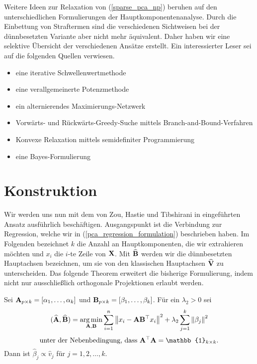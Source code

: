 Weitere Ideen zur Relaxation von (\ref{sparse_pca_np}) beruhen auf den unterschiedlichen Formulierungen der Hauptkomponentenanalyse. Durch die Einbettung von Straftermen sind die verschiedenen Sichtweisen bei der dünnbesetzten Variante aber nicht mehr äquivalent. Daher haben wir eine selektive Übersicht der verschiedenen Ansätze erstellt. Ein interessierter Leser sei auf die folgenden Quellen verwiesen.
\begin{itemize}
\item eine iterative Schwellenwertmethode \cite{shen, witten}
\item eine verallgemeinerte Potenzmethode \cite{journee}
\item ein alternierendes Maximierungs-Netzwerk \cite{richtarik}
\item Vorwärts- und Rückwärts-Greedy-Suche mittels Branch-and-Bound-Verfahren \cite{moghaddam}
\item Konvexe Relaxation mittels semidefiniter Programmierung \cite{daspremont_semidefinite}
\item eine Bayes-Formulierung \cite{guan}
\end{itemize}




\section{Konstruktion}
\label{construction}

Wir werden uns nun mit dem von Zou, Hastie und Tibshirani in \cite{zou_sparsepca} eingeführten Ansatz ausführlich beschäftigen. Ausgangspunkt ist die Verbindung zur Regression, welche wir in (\ref{pca_regression_formulation}) beschrieben haben. Im Folgenden bezeichnet $k$ die Anzahl an Hauptkomponenten, die wir extrahieren möchten und $x_i$ die $i$-te Zeile von $\mathbf{X}$. Mit $\widehat{\mathbf{B}}$ werden wir die dünnbesetzten Hauptachsen bezeichnen, um sie von den klassischen Hauptachsen $\widehat{\mathbf{V}}$ zu unterscheiden. Das folgende Theorem erweitert die bisherige Formulierung, indem nicht nur ausschließlich orthogonale Projektionen erlaubt werden. 

\begin{thm} \label{pca_regression_formulation_ridge}
Sei $\mathbf{A}_{p \times k} = [ \alpha_1, \ldots ,\alpha_k ]$ und $\mathbf{B}_{p \times k} = [ \beta_1, \ldots ,\beta_k ]$. Für ein $\lambda_2 > 0$ sei
$$(\widehat{\mathbf{A}}, \widehat{\mathbf{B}}) = \operatorname*{arg\,min}_{\mathbf{A}, \mathbf{B}} \sum_{i=1}^{n} \left\lVert x_i - \mathbf{A}\mathbf{B}^{\top}x_i \right\rVert^2 + \lambda_2 \sum_{j=1}^{k}\left\lVert \beta_j \right\rVert^2$$
$$\text{unter der Nebenbedingung, dass } \mat{A}^{\top}\mat{A} = \mat{\mathbb{1}}_{k \times k}.$$
Dann ist $\widehat{\beta}_j \propto \widehat{v}_j$ für $j = 1,2,\ldots,k$. 
\end{thm}

